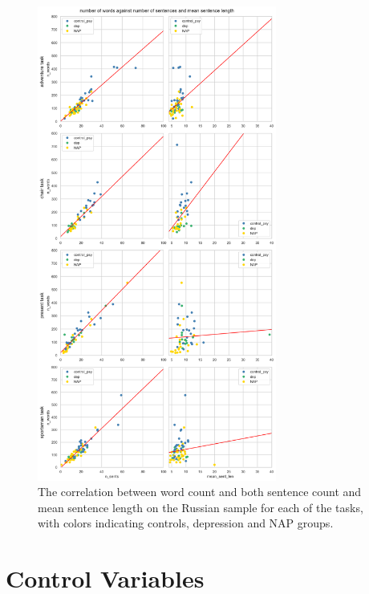 \begin{figure}[p]
\begin{center}
    \includegraphics[width=0.7\textwidth]{Figures/chapter_4/ru_n_words_n_sents.png} 
\caption[Russian Clinical Dataset: Length Characteristics]{\label{fig:data:ru:length} The correlation between word count and both sentence count and mean sentence length on the Russian sample for each of the tasks, with colors indicating controls, depression and NAP groups.}
\end{center}
\end{figure}

\pagebreak



\section{Control Variables}
\label{sec:results:clinical:control_variables}

